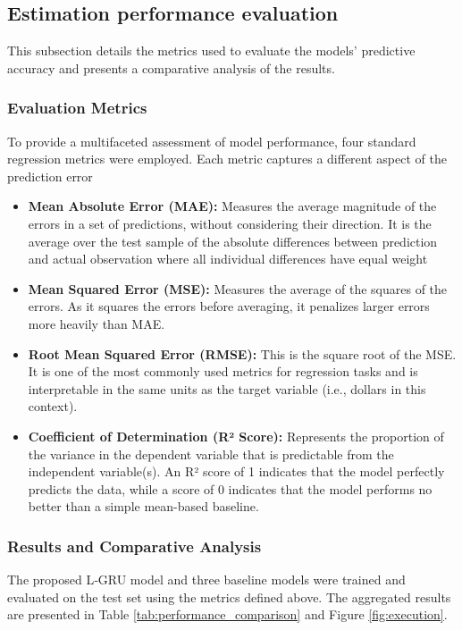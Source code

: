\documentclass{cys}
\begin{document}
\begin{enumerate}
\subsection{Estimation performance evaluation}
This subsection details the metrics used to evaluate the models' predictive accuracy and presents a comparative analysis of the results.

\subsubsection{Evaluation Metrics}

    To provide a multifaceted assessment of model performance, four standard regression metrics were employed. Each metric captures a different aspect of the prediction error
    \begin{itemize}
        \item \textbf{Mean Absolute Error (MAE):}
        Measures the average magnitude of the errors in a set of predictions, without considering their direction. It is the average over the test sample of the absolute differences between prediction and actual observation where all individual differences have equal weight
        \item \textbf{Mean Squared Error (MSE):}
        Measures the average of the squares of the errors. As it squares the errors before averaging, it penalizes larger errors more heavily than MAE.
        \item \textbf{Root Mean Squared Error (RMSE):}
        This is the square root of the MSE. It is one of the most commonly used metrics for regression tasks and is interpretable in the same units as the target variable (i.e., dollars in this context).
        \item \textbf{Coefficient of Determination (R² Score):}
        Represents the proportion of the variance in the dependent variable that is predictable from the independent variable(s). An R² score of 1 indicates that the model perfectly predicts the data, while a score of 0 indicates that the model performs no better than a simple mean-based baseline.
    \end{itemize}

\subsubsection{Results and Comparative Analysis}
    
    The proposed L‑GRU model and three baseline models were trained and evaluated on the test set using the metrics defined above. The aggregated results are presented in Table \ref{tab:performance_comparison} and Figure \ref{fig:execution}.


\end{enumerate}
\end{document}
